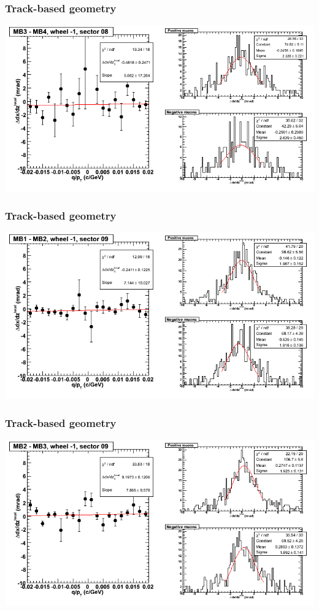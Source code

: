 \documentclass[compress]{beamer}
\begin{document}
\begin{frame}
\frametitle{Track-based geometry}
\includegraphics[width=\linewidth]{NOV4_segdiffs/dt13_slope_B_08_34.png}
\end{frame}

\begin{frame}
\frametitle{Track-based geometry}
\includegraphics[width=\linewidth]{NOV4_segdiffs/dt13_slope_B_09_12.png}
\end{frame}

\begin{frame}
\frametitle{Track-based geometry}
\includegraphics[width=\linewidth]{NOV4_segdiffs/dt13_slope_B_09_23.png}
\end{frame}
\end{document}
